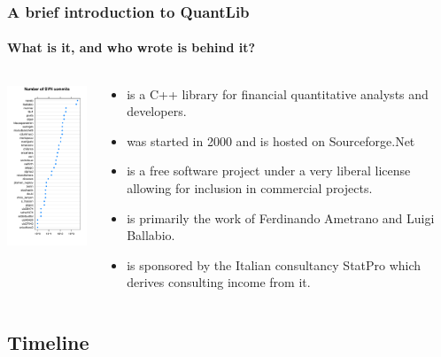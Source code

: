 \documentclass[compress]{beamer}
\begin{document}
\begin{frame}
  \frametitle{A brief introduction to QuantLib}
  \framesubtitle{What is it, and who wrote is behind it?}
  \begin{columns}
    
    \begin{column}{1.5in}
      \includegraphics[width=1.5in]{figures/ql-svn.pdf}
    \end{column}

    \pause
    \begin{column}{3.1in}
      \begin{itemize}[<+-|alert@+>]
      \item \QL is a C++ library for financial quantitative analysts and developers.
      \item \QL was started in 2000 and is hosted on Sourceforge.Net
      \item \QL is a free software project under a very liberal license allowing
        for inclusion in commercial projects.
      \item \QL is primarily the work of Ferdinando Ametrano and Luigi Ballabio.
      \item \QL is sponsored by the Italian consultancy StatPro which derives
        consulting income from it. 
      \end{itemize}
    \end{column}
  \end{columns}
\end{frame}


\subsection{Timeline}
\end{document}
